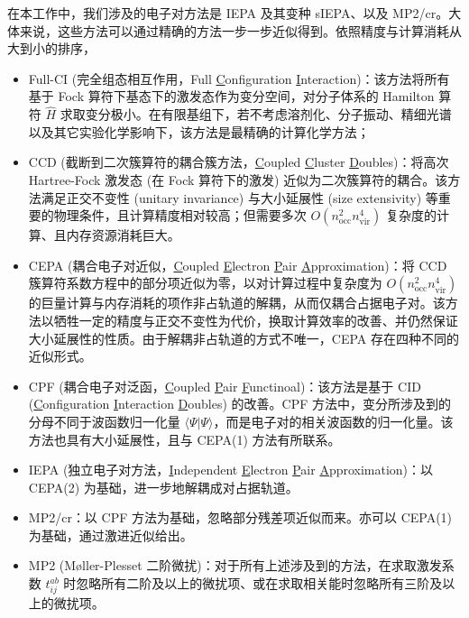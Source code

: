 在本工作中，我们涉及的电子对方法是 IEPA 及其变种 sIEPA、以及 MP2/cr。大体来说，这些方法可以通过精确的方法一步一步近似得到。依照精度与计算消耗从大到小的排序，
\begin{itemize}[nosep]
  \item Full-CI (完全组态相互作用，Full \underline{C}onfiguration \underline{I}nteraction)：该方法将所有基于 Fock 算符下基态下的激发态作为变分空间，对分子体系的 Hamilton 算符 $\hat H$ 求取变分极小。在有限基组下，若不考虑溶剂化、分子振动、精细光谱以及其它实验化学影响下，该方法是最精确的计算化学方法；
  \item CCD (截断到二次簇算符的耦合簇方法，\underline{C}oupled \underline{C}luster \underline{D}oubles)\cite{Coester-Coester.NPB.1958, Coester-Kuemmel.NPB.1960, Cizek-Cizek.JCP.1966, Cizek-Paldus.IJQC.1971}：将高次 Hartree-Fock 激发态 (在 Fock 算符下的激发) 近似为二次簇算符的耦合。该方法满足正交不变性 (unitary invariance) 与大小延展性 (size extensivity) 等重要的物理条件，且计算精度相对较高；但需要多次 $O(n_\mathrm{occ}^2 n_\mathrm{vir}^4)$ 复杂度的计算、且内存资源消耗巨大。
  \item CEPA (耦合电子对近似，\underline{C}oupled \underline{E}lectron \underline{P}air \underline{A}pproximation)\cite{Ahlrichs-Ahlrichs.CPC.1979}：将 CCD 簇算符系数方程中的部分项近似为零，以对计算过程中复杂度为 $O(n_\mathrm{occ}^2 n_\mathrm{vir}^4)$ 的巨量计算与内存消耗的项作非占轨道的解耦，从而仅耦合占据电子对。该方法以牺牲一定的精度与正交不变性为代价，换取计算效率的改善、并仍然保证大小延展性的性质。由于解耦非占轨道的方式不唯一，CEPA 存在四种不同的近似形式。
  \item CPF (耦合电子对泛函，\underline{C}oupled \underline{P}air \underline{F}unctinoal)：该方法是基于 CID (\underline{C}onfiguration \underline{I}nteraction \underline{D}oubles) 的改善。CPF 方法中，变分所涉及到的分母不同于波函数归一化量 $\langle \Psi | \Psi \rangle$，而是电子对的相关波函数的归一化量。该方法也具有大小延展性，且与 CEPA(1) 方法有所联系。
  \item IEPA (独立电子对方法，\underline{I}ndependent \underline{E}lectron \underline{P}air \underline{A}pproximation)\cite{Sinanoǧlu-Sinanoǧlu.ACP.1964, Nesbet-Nesbet.ACP.1965}：以 CEPA(2) 为基础，进一步地解耦成对占据轨道。
  \item MP2/cr\cite{Dykstra-Davidson.IJQC.2000}：以 CPF 方法为基础，忽略部分残差项近似而来。亦可以 CEPA(1) 为基础，通过激进近似给出。
  \item MP2 (M\o{}ller-Plesset 二阶微扰)：对于所有上述涉及到的方法，在求取激发系数 $t_{ij}^{ab}$ 时忽略所有二阶及以上的微扰项、或在求取相关能时忽略所有三阶及以上的微扰项。
\end{itemize}

